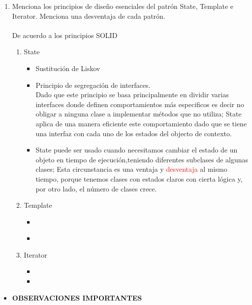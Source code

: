 \documentclass[a4paper,10pt]{article}
\begin{document}
\begin{enumerate}
    
    \item Menciona los principios de diseño esenciales del patrón State, Template e Iterator. Menciona una desventaja de cada patrón.\\\\ De acuerdo a los principios SOLID
        \begin{enumerate}
            \item \colorbox[rgb]{0.53, 0.81, 0.98}{State}
                \begin{itemize}
                    \item Sustitución de Liskov
                    \item Principio de segregación de interfaces.\\Dado que este principio se basa principalmente en dividir varias interfaces
                          donde definen comportamientos más especificos es decir no obligar a ninguna clase a implementar métodos que no utiliza;
                          State aplica de una manera eficiente este comportamiento dado que se tiene una interfaz con cada uno de los estados del 
                          objecto de contexto.
                    \item State puede ser usado cuando necesitamos cambiar el estado de un objeto en tiempo de ejecución,teniendo diferentes subclases de algunas  
                    clases; Esta circunstancia es una ventaja y \textcolor{red}{desventaja} al mismo tiempo, porque tenemos clases con estados claros con cierta lógica y, por otro lado, el número de clases crece.
                   
                \end{itemize}


            
            \item \colorbox[rgb]{1.0, 0.71, 0.76}{Template}
            \begin{itemize}
                \item 
                \item 
                 \\
                
            \end{itemize}
            

            \item \colorbox[rgb]{0.69, 0.61, 0.85}{Iterator}
            \begin{itemize}
                \item %
                \item        
            \end{itemize}    
        \end{enumerate}
\end{enumerate}

\begin{itemize}
    \item \textbf{OBSERVACIONES IMPORTANTES}
\end{itemize}
\end{document}
